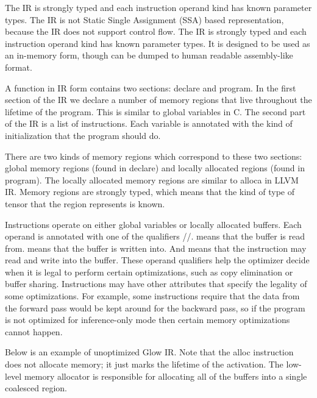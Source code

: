 The IR is strongly typed and each instruction operand kind has known parameter types. The IR is not Static Single Assignment (S\+SA) based representation, because the IR does not support control flow. The IR is strongly typed and each instruction operand kind has known parameter types. It is designed to be used as an in-\/memory form, though can be dumped to human readable assembly-\/like format.

A function in IR form contains two sections\+: \textquotesingle{}declare\textquotesingle{} and \textquotesingle{}program\textquotesingle{}. In the first section of the IR we declare a number of memory regions that live throughout the lifetime of the program. This is similar to global variables in C. The second part of the IR is a list of instructions. Each variable is annotated with the kind of initialization that the program should do.

There are two kinds of memory regions which correspond to these two sections\+: global memory regions (found in \textquotesingle{}declare\textquotesingle{}) and locally allocated regions (found in \textquotesingle{}program\textquotesingle{}). The locally allocated memory regions are similar to \textquotesingle{}alloca\textquotesingle{} in L\+L\+VM IR. Memory regions are strongly typed, which means that the kind of type of tensor that the region represents is known.

Instructions operate on either global variables or locally allocated buffers. Each operand is annotated with one of the qualifiers \textquotesingle{}\textquotesingle{}/\textquotesingle{}\textquotesingle{}/\textquotesingle{}\textquotesingle{}. \textquotesingle{}\textquotesingle{} means that the buffer is read from. \textquotesingle{}\textquotesingle{} means that the buffer is written into. And \textquotesingle{}\textquotesingle{} means that the instruction may read and write into the buffer. These operand qualifiers help the optimizer decide when it is legal to perform certain optimizations, such as copy elimination or buffer sharing. Instructions may have other attributes that specify the legality of some optimizations. For example, some instructions require that the data from the forward pass would be kept around for the backward pass, so if the program is not optimized for inference-\/only mode then certain memory optimizations cannot happen.

Below is an example of unoptimized Glow IR. Note that the \textquotesingle{}alloc\textquotesingle{} instruction does not allocate memory; it just marks the lifetime of the activation. The low-\/level memory allocator is responsible for allocating all of the buffers into a single coalesced region.


